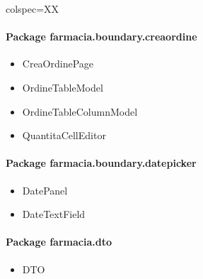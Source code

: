 \begin{table}[!ht]
\begin{tblr}{colspec=XX}
\begin{minipage}[t]{0.45\textwidth}
			\paragraph{Package farmacia.boundary.creaordine}
			\begin{itemize}[label=--]
				\item CreaOrdinePage
				\item OrdineTableModel
				\item OrdineTableColumnModel
				\item QuantitaCellEditor
			\end{itemize}

			\paragraph{Package farmacia.boundary.datepicker}
			\begin{itemize}[label=--]
				\item DatePanel
				\item DateTextField
			\end{itemize}

			\paragraph{Package farmacia.dto}
			\begin{itemize}[label=--]
				\item DTO
			\end{itemize}
		\end{minipage} \\
	\end{tblr}
\end{table}

